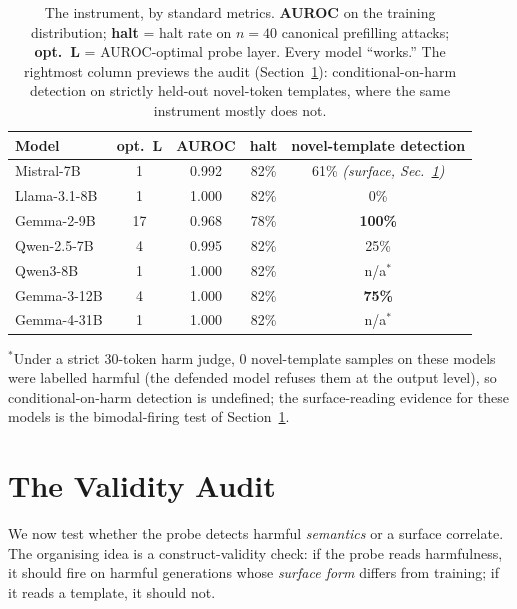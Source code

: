 \documentclass{article}
\begin{document}
\begin{table}[t]
\caption{The instrument, by standard metrics. \textbf{AUROC} on the training distribution; \textbf{halt} = halt rate on $n{=}40$ canonical prefilling attacks; \textbf{opt.\ L} = AUROC-optimal probe layer. Every model ``works.'' The rightmost column previews the audit (Section~\ref{sec:audit}): conditional-on-harm detection on strictly held-out novel-token templates, where the same instrument mostly does not.}
\label{tab:instrument}
\centering
\small
\begin{tabular}{lcccc}
\toprule
\textbf{Model} & \textbf{opt.\ L} & \textbf{AUROC} & \textbf{halt} & \textbf{novel-template detection} \\
\midrule
Mistral-7B     & 1  & 0.992 & 82\% & 61\% \emph{(surface, Sec.~\ref{sec:audit})} \\
Llama-3.1-8B   & 1  & 1.000 & 82\% & 0\% \\
Gemma-2-9B     & 17 & 0.968 & 78\% & \textbf{100\%} \\
Qwen-2.5-7B    & 4  & 0.995 & 82\% & 25\% \\
Qwen3-8B       & 1  & 1.000 & 82\% & n/a$^*$ \\
Gemma-3-12B    & 4  & 1.000 & 82\% & \textbf{75\%} \\
Gemma-4-31B    & 1  & 1.000 & 82\% & n/a$^*$ \\
\bottomrule
\end{tabular}

\vspace{2pt}
{\footnotesize $^*$Under a strict $30$-token harm judge, $0$ novel-template samples on these models were labelled harmful (the defended model refuses them at the output level), so conditional-on-harm detection is undefined; the surface-reading evidence for these models is the bimodal-firing test of Section~\ref{sec:audit}.}
\end{table}

\section{The Validity Audit}
\label{sec:audit}

We now test whether the probe detects harmful \emph{semantics} or a surface correlate. The organising idea is a construct-validity check: if the probe reads harmfulness, it should fire on harmful generations whose \emph{surface form} differs from training; if it reads a template, it should not.
\end{document}
